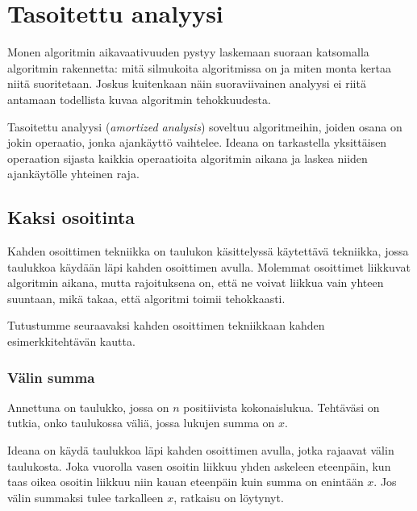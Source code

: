 \chapter{Tasoitettu analyysi}


Monen algoritmin aikavaativuuden pystyy laskemaan
suoraan katsomalla algoritmin rakennetta:
mitä silmukoita algoritmissa on ja miten monta
kertaa niitä suoritetaan.
Joskus kuitenkaan näin suoraviivainen analyysi ei
riitä antamaan todellista kuvaa algoritmin tehokkuudesta.

Tasoitettu analyysi (\textit{amortized analysis})
soveltuu algoritmeihin, joiden osana on jokin operaatio,
jonka ajankäyttö vaihtelee.
Ideana on tarkastella yksittäisen operaation
sijasta kaikkia operaatioita algoritmin
aikana ja laskea niiden ajankäytölle yhteinen raja.

\section{Kaksi osoitinta}


Kahden osoittimen tekniikka on taulukon käsittelyssä
käytettävä tekniikka, jossa taulukkoa käydään läpi
kahden osoittimen avulla.
Molemmat osoittimet liikkuvat algoritmin aikana,
mutta rajoituksena on, että ne voivat liikkua vain
yhteen suuntaan, mikä takaa, että algoritmi toimii tehokkaasti.

Tutustumme seuraavaksi kahden osoittimen tekniikkaan
kahden esimerkkitehtävän kautta.

\subsection{Välin summa}

\begin{task}
Annettuna on taulukko, jossa on $n$ positiivista kokonaislukua.
Tehtäväsi on tutkia, onko taulukossa väliä,
jossa lukujen summa on $x$.
\end{task}

Ideana on käydä taulukkoa läpi kahden osoittimen
avulla, jotka rajaavat välin taulukosta.
Joka vuorolla vasen osoitin liikkuu
yhden askeleen eteenpäin, kun taas oikea osoitin
liikkuu niin kauan eteenpäin kuin summa on enintään $x$.
Jos välin summaksi tulee tarkalleen $x$, ratkaisu on löytynyt.

